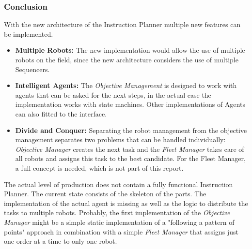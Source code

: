 \subsubsection{Conclusion}
With the new architecture of the Instruction Planner multiple new features can be implemented.
\begin{itemize}
    \item \textbf{Multiple Robots:} The new implementation would allow the use of multiple robots on the field, since
    the new architecture considers the use of multiple Sequencers.
    \item \textbf{Intelligent Agents:} The \textit{Objective Management} is designed to work with agents that can be asked
    for the next steps, in the actual case the implementation works with state machines. Other implementations of Agents can
    also fitted to the interface.
    \item \textbf{Divide and Conquer:} Separating the robot management from the objective management separates two problems
    that can be handled individually: \textit{Objective Manager} creates the next task and the \textit{Fleet Manager} takes care
    of all robots and assigns this task to the best candidate. For the Fleet Manager, a full concept is needed, which is not part of this report.
\end{itemize}

The actual level of production does not contain a fully functional Instruction Planner.
The current state consists of the skeleton of the parts. The implementation of the
actual agent is missing as well as the logic to distribute the tasks to multiple robots.
Probably, the first implementation of the \textit{Objective Manager} might be a
simple static implementation of a "following a pattern of points" approach in combination with a simple \textit{Fleet Manager} that
assigns just one order at a time to only one robot.
